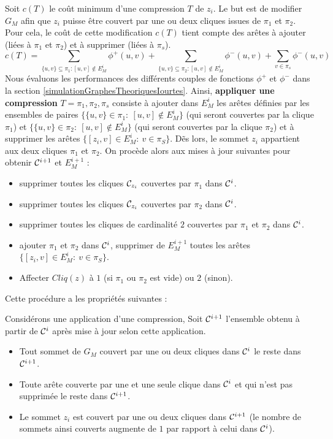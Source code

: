 Soit  $c(T)$ le co\^ut minimum d'une compression $T$ de $z_i$.
Le but est de modifier $G_M$ afin que $z_i$ puisse \^etre couvert par une ou deux cliques issues de $\pi_1$ et $\pi_2$.
Pour cela, le co\^ut de cette modification $c(T)$ tient compte des ar\^etes \`a ajouter (li\'ees \`a $\pi_1$ et $\pi_2$) et \`a supprimer (li\'ees \`a $\pi_s$).
\begin{equation}
c(T) = \sum_{ \{u,v\} \subseteq \pi_1: [u,v] \notin E_M^i } \phi^{+}(u,v) + \sum_{ \{u,v\} \subseteq \pi_2: [u,v] \notin E_M^i } \phi^{-}(u,v) + \sum_{ v \in \pi_s } \phi^{-}(u,v)
\end{equation}
Nous \'evaluons les performances des diff\'erents couples de fonctions $\phi^{+}$ et $\phi^{-}$ dans la section \ref{simulationGraphesTheoriquesIourtes}.
\newline
Ainsi, {\bf appliquer une compression} $T = \pi_1, \pi_2, \pi_s$ consiste \`a ajouter dans $E_M^i$ les ar\^etes d\'efinies par les ensembles de paires $\{\{u,v\} \in \pi_1:~[u,v]\not\in E_{M}^{i}\}$ (qui seront couvertes par la clique $\pi_1$) et $\{\{u,v\} \in \pi_2:~[u,v]\not\in  E_{M}^{i}\}$ (qui seront couvertes par la clique $\pi_2$) et \`a supprimer les ar\^etes $\{[z_i,v] \in  E_{M}^{i}:~v\in \pi_S\}$. 
\newline
D\~es lors, le sommet $z_i$ appartient aux deux cliques $\pi_1$ et $\pi_2$.
On proc\`ede alors aux mises \`a jour suivantes pour obtenir ${\cal C}^{i+1}$ et $E_M^{i+1}$ :
\begin{itemize}
\item supprimer toutes les cliques ${\cal C}_{z_i}$ couvertes par $\pi_1$ dans  ${\cal C}^{i}$.
\item supprimer toutes les cliques ${\cal C}_{z_i}$ couvertes par $\pi_2$ dans  ${\cal C}^{i}$.
\item supprimer toutes les cliques de cardinalit\'e $2$ couvertes par $\pi_1$ et $\pi_2$ dans  ${\cal C}^{i}$.
\item ajouter $\pi_1$ et $\pi_2$ dans ${\cal C}^{i}$, supprimer de $E_M^{i+1}$ toutes les ar\^etes  $\{[z_i,v] \in E_M^{i}:~v\in \pi_S\}$.
\item Affecter $Cliq(z)$ \`a $1$ (si $\pi_1$  ou $\pi_2$ est vide) ou $2$ (sinon).
\end{itemize}
Cette proc\'edure a les propri\'et\'es suivantes :
\begin{property}
Consid\'erons une application d'une compression,
Soit ${\cal C}^{i+1}$  l'ensemble obtenu \`a partir de ${\cal C}^{i}$ apr\`es  mise \`a jour selon cette application.
\begin{itemize}
	\item Tout sommet de $G_M$ couvert par une ou deux cliques dans ${\cal C}^{i}$ le reste dans ${\cal C}^{i+1}$.
	\item Toute ar\^ete couverte par une et une seule clique dans ${\cal C}^{i}$ et qui n'est pas supprim\'ee le reste dans ${\cal C}^{i+1}$.
	\item Le sommet $z_i$ est couvert par une ou deux cliques dans ${\cal C}^{i+1}$ (le nombre de sommets ainsi couverts augmente de $1$ par rapport \`a celui dans ${\cal C}^{i}$).
\end{itemize}
\end{property}

